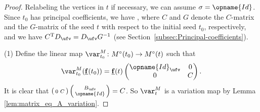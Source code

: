 \documentclass[pdftex]{sigma}
\newcommand{\Mc}{M^\circ}
\newcommand{\Id}{{\opname{Id}}}
\newcommand{\ff}{\mathbf{f}}
\newcommand{\uff}{\underline{\ff}}
\numberwithin{equation}{section}
\begin{document}
\begin{proof}
Relabeling the vertices in $t$ if necessary, we can assume $\sigma=\Id$.
Since $t_{0}$ has principal coefficients, we have , where $C$ and $G$ denote the $C$-matrix and the $G$-matrix of
the seed $t$ with respect to the initial seed $t_{0}$, respectively,
and we have $C^{\rm T}D_{\ufv}=D_{\ufv}G^{-1}$ (see Section~\ref{subsec:Principal-coefficients}).

(1) Define the linear map $\var_{t_{0}}^{M}\colon\Mc(t_{0})\rightarrow\Mc(t)$
such that{\samepage
\begin{align*}
\var_{t_{0}}^{M}(\uff(t_{0})) =\uff(t)\begin{pmatrix}
\Id_{\ufv} & 0\\
0 & C
\end{pmatrix}.
\end{align*}
It is clear that $\left(\begin{smallmatrix}
0 & C\end{smallmatrix}\right)\left(\begin{smallmatrix}
B_{\ufv}\\
\Id
\end{smallmatrix}\right)=C$. So $\var_{t}^{M}$ is a variation map by Lemma \ref{lem:matrix_eq_A_variation}.}


\end{proof}
\end{document}
